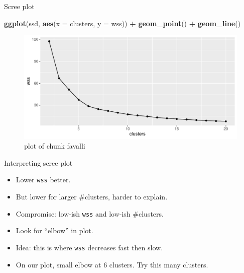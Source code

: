 \documentclass[ignorenonframetext,]{beamer}
\newenvironment{Shaded}{\begin{snugshade}}{\end{snugshade}}
\newcommand{\DataTypeTok}[1]{\textcolor[rgb]{0.13,0.29,0.53}{#1}}
\newcommand{\KeywordTok}[1]{\textcolor[rgb]{0.13,0.29,0.53}{\textbf{#1}}}
\newcommand{\NormalTok}[1]{#1}
\newcommand{\OperatorTok}[1]{\textcolor[rgb]{0.81,0.36,0.00}{\textbf{#1}}}
\newcommand{\StringTok}[1]{\textcolor[rgb]{0.31,0.60,0.02}{#1}}
\begin{document}
\begin{frame}[fragile]{Scree plot}
\protect\hypertarget{scree-plot}{}

\begin{Shaded}
\begin{Highlighting}[]
\KeywordTok{ggplot}\NormalTok{(ssd, }\KeywordTok{aes}\NormalTok{(}\DataTypeTok{x =}\NormalTok{ clusters, }\DataTypeTok{y =}\NormalTok{ wss)) }\OperatorTok{+}\StringTok{ }\KeywordTok{geom_point}\NormalTok{() }\OperatorTok{+}
\StringTok{  }\KeywordTok{geom_line}\NormalTok{()}
\end{Highlighting}
\end{Shaded}

\begin{figure}
\centering
\includegraphics{figure/favalli-1.pdf}
\caption{plot of chunk favalli}
\end{figure}

\end{frame}

\begin{frame}[fragile]{Interpreting scree plot}
\protect\hypertarget{interpreting-scree-plot}{}

\begin{itemize}
\item
  Lower \texttt{wss} better.
\item
  But lower for larger \#clusters, harder to explain.
\item
  Compromise: low-ish \texttt{wss} and low-ish \#clusters.
\item
  Look for ``elbow'' in plot.
\item
  Idea: this is where \texttt{wss} decreases fast then slow.
\item
  On our plot, small elbow at 6 clusters. Try this many clusters.
\end{itemize}

\end{frame}
\end{document}

